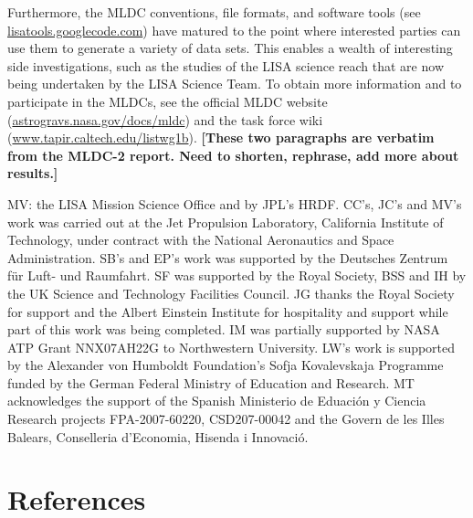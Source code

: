 \documentclass{iopart}
\begin{document}
Furthermore, the MLDC conventions, file formats, and software tools (see \url{lisatools.googlecode.com}) have matured to the point where interested parties can use them to generate a variety of data sets. This enables a wealth of interesting side investigations, such as the studies of the LISA science reach that are now being undertaken by the LISA Science Team. To obtain more information and to participate in the MLDCs, see the official MLDC website (\url{astrogravs.nasa.gov/docs/mldc}) and the task force wiki (\url{www.tapir.caltech.edu/listwg1b}).
\textbf{[These two paragraphs are verbatim from the MLDC-2 report. Need to shorten, rephrase, add more about results.]}

\ack

MV: the LISA Mission Science Office and by JPL's HRDF.
CC's, JC's and MV's work was carried out at the Jet Propulsion Laboratory, California Institute of Technology, under contract with the National Aeronautics and Space Administration.
SB's and EP's work was supported by the Deutsches Zentrum f\"ur Luft- und Raumfahrt.
SF was supported by the Royal Society, BSS and IH by the UK Science and Technology Facilities Council.
JG thanks the Royal Society for support and the Albert Einstein
Institute for hospitality and support while part of this work was
being completed. IM was partially supported by NASA ATP Grant
NNX07AH22G to Northwestern University. LW's work is supported by the
Alexander von Humboldt Foundation's Sofja Kovalevskaja Programme
funded by the German Federal Ministry of Education and Research.
MT acknowledges the support of the Spanish Ministerio de Eduaci\'on y
Ciencia Research projects FPA-2007-60220, CSD207-00042 and the Govern
de les Illes Balears, Conselleria d'Economia, Hisenda i Innovaci\'o.



\section*{References}
\end{document}
